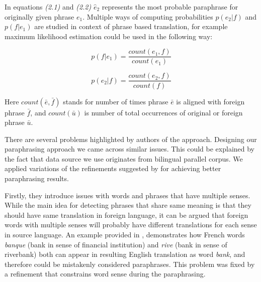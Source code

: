 \begin{center}
\textit{\cite{Callison-Burch2007}}
\end{center}

In equations \textit{(2.1)} and \textit{(2.2)} $\hat{e}_{2}$ represents the most probable paraphrase for originally given phrase $e_{1}$. Multiple ways of computing probabilities $p(e_{2} | f)$ and $p(f | e_{1})$ are studied in context of phrase based translation, for example maximum likelihood estimation could be used in the following way:

\begin{large}
\begin{equation}
p(f | e_{1}) = \frac{count(e_{1}, f)}{count(e_{1})} 
\end{equation}
\end{large}

\begin{large}
\begin{equation}
p(e_{2} | f) = \frac{count(e_{2}, f)}{count(f)}
\end{equation}
\end{large} 

\begin{center}
\textit{\cite{Callison-Burch2007}}
\end{center}

Here $count(\bar{e}, \bar{f})$ stands for number of times phrase $\bar{e}$ is aligned with foreign phrase $\bar{f}$, and $count(\bar{u})$ is number of total occurrences of original or foreign phrase $\bar{u}$. 

There are several problems highlighted by authors of the approach. Designing our paraphrasing approach we came across similar issues. This could be explained by the fact that data source we use originates from bilingual parallel corpus. We applied variations of the refinements suggested by \cite{Callison-Burch2007} for achieving better paraphrasing results.  

Firstly, they introduce issues with words and phrases that have multiple senses. While the main idea for detecting phrases that share same meaning is that they should have same translation in foreign language, it can be argued that foreign words with multiple senses will probably have different translations for each sense in source language. An example provided in \cite{Callison-Burch2007}, demonstrates how French words \textit{banque} (bank in sense of financial institution) and \textit{rive} (bank in sense of riverbank) both can appear in resulting English translation as word \textit{bank}, and therefore could be mistakenly considered paraphrases. This problem was fixed by a refinement that constrains word sense during the paraphrasing. 

